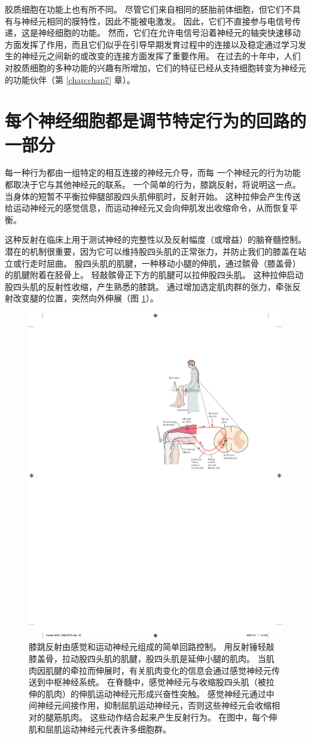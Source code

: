 胶质细胞在功能上也有所不同。 
尽管它们来自相同的胚胎前体细胞，但它们不具有与神经元相同的膜特性，因此不能被电激发。 
因此，它们不直接参与电信号传递，这是神经细胞的功能。 
然而，它们在允许电信号沿着神经元的轴突快速移动方面发挥了作用，而且它们似乎在引导早期发育过程中的连接以及稳定通过学习发生的神经元之间新的或改变的连接方面发挥了重要作用。 
在过去的十年中，人们对胶质细胞的多种功能的兴趣有所增加，它们的特征已经从支持细胞转变为神经元的功能伙伴（第 \ref{chap:chap7} 章）。


\section{每个神经细胞都是调节特定行为的回路的一部分}
每一种行为都由一组特定的相互连接的神经元介导，而每
一个神经元的行为功能都取决于它与其他神经元的联系。 一个简单的行为，膝跳反射，将说明这一点。 
当身体的短暂不平衡拉伸腿部股四头肌伸肌时，反射开始。 
这种拉伸会产生传送给运动神经元的感觉信息，而运动神经元又会向伸肌发出收缩命令，从而恢复平衡。


这种反射在临床上用于测试神经的完整性以及反射幅度（或增益）的脑脊髓控制。 
潜在的机制很重要，因为它可以维持股四头肌的正常张力，并防止我们的膝盖在站立或行走时屈曲。 
股四头肌的肌腱，一种移动小腿的伸肌，通过髌骨（膝盖骨）的肌腱附着在胫骨上。 
轻敲髌骨正下方的肌腱可以拉伸股四头肌。 
这种拉伸启动股四头肌的反射性收缩，产生熟悉的膝跳。 
通过增加选定肌肉群的张力，牵张反射改变腿的位置，突然向外伸展（图 \ref{fig:3_5}）。

\begin{figure}[htbp]
	\centering
	\includegraphics[width=0.5\linewidth]{chap03/fig_3_5}
	\caption{膝跳反射由感觉和运动神经元组成的简单回路控制。 
		用反射锤轻敲膝盖骨，拉动股四头肌的肌腱，股四头肌是延伸小腿的肌肉。
		当肌肉因肌腱的牵拉而伸展时，有关肌肉变化的信息会通过感觉神经元传送到中枢神经系统。 
		在脊髓中，感觉神经元与收缩股四头肌（被拉伸的肌肉）的伸肌运动神经元形成兴奋性突触。 
		感觉神经元通过中间神经元间接作用，抑制屈肌运动神经元，否则这些神经元会收缩相对的腿筋肌肉。 
		这些动作结合起来产生反射行为。 
		在图中，每个伸肌和屈肌运动神经元代表许多细胞群。}
	\label{fig:3_5}
\end{figure}


